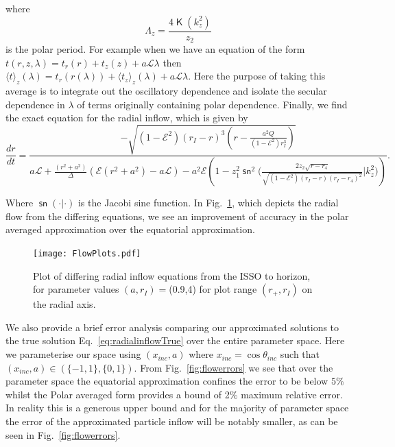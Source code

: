 \documentclass[12pt, amsmath]{revtex4-2}
\newcommand\lam{\lambda}
\newcommand\EN{\mathcal{E}}
\newcommand\ANG{\mathcal{L}}
\DeclareMathOperator{\sn}{\mathsf{sn}}
\newcommand{\elK}{\operatorname{\mathsf{K}}}%
\begin{document}
where
\begin{equation}
    \Lambda_z = \frac{4 \elK(k_z^2)}{z_2}
\end{equation}
is the polar period.
For example when we have an equation of the form $t(r,z,\lam) = t_r(r)+t_z(z)+a \ANG \lam$ then $\langle t \rangle _{z}(\lam)  = t_r(r(\lam))+\langle t_z \rangle _{z}(\lam) +a \ANG \lam$. Here the purpose of taking this average is to integrate out the oscillatory dependence and isolate the secular dependence in $\lam$ of terms originally containing polar dependence.
Finally, we find the exact equation for the radial inflow, which is given by 
\begin{equation}\label{eq:radialinflowTrue}
   \frac{dr}{ dt } =\frac{-\sqrt{(1-\EN^2)(r_I-r)^3(r-\frac{a^2Q}{(1-\EN^2)r_{I}^{3}})}}{a\mathcal{L}+\frac{(r^2+a^2)}{\Delta}(\mathcal{E}(r^2+a^2)-a\mathcal{L})-a^2\EN(1 -  z_1^2 \mathrm{\sn}^2\big( \frac{2 z_2 \sqrt{r-r_4}}{\sqrt{(1-\EN^2)(r_I-r)(r_I-r_4)^2}}\big| k_z^2\big) )}.
\end{equation}

Where $\sn(\cdot|\cdot)$ is the Jacobi sine function. In Fig.~\ref{fig:flows}, which depicts the radial flow from the differing equations, we see an improvement of accuracy in the polar averaged approximation over the equatorial approximation. 

\begin{figure}[tb!]
    \centering
    \texttt{[image: FlowPlots.pdf]}
        \caption{Plot of differing radial inflow equations from the ISSO to horizon, for parameter values $(a,r_I) = $(0.9,4) for plot range $(r_+,r_I)$ on the radial axis.}
    \label{fig:flows}
\end{figure}


We also provide a brief error analysis comparing our approximated solutions to the true solution Eq.~\eqref{eq:radialinflowTrue} over the entire parameter space. Here we parameterise our space using $(x_{inc},a)$ where $x_{inc} = \cos{\theta_{inc}}$ such that   $(x_{inc},a) \in(\{-1,1\}, \{0,1\})$. From Fig.~\ref{fig:flowerrors} we see that over the parameter space the equatorial approximation confines the error to be below $5\%$  whilst the Polar averaged form provides a bound of 2$\%$ maximum relative error. In reality this is a generous upper bound and for the majority of parameter space the error of the approximated particle inflow will be notably smaller, as can be seen in Fig.~\ref{fig:flowerrors}.
\end{document}
